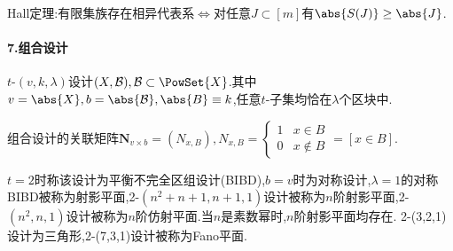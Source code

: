 \documentclass{article}
\begin{document}
Hall定理:有限集族存在相异代表系$\iff$对任意$J\subset [m]$有$\abs{S(J)}\geq \abs{J}$.

\paragraph{7.组合设计}$t$-$(v,k,\lambda)$设计$(X,\mathcal{B}),\mathcal{B}\subset \PowSet{X}$.其中$v=\abs{X},b=\abs{\mathcal{B}},\abs{B}\equiv k$,任意$t$-子集均恰在$\lambda$个区块中.

组合设计的关联矩阵$\bm{N}_{v\times b}=(N_{x,B}),N_{x,B}=\begin{cases}
    1&x\in B\\0&x\notin B
\end{cases}=[x\in B]$.

$t=2$时称该设计为平衡不完全区组设计(BIBD),$b=v$时为对称设计,$\lambda=1$的对称BIBD被称为射影平面,2-$(n^2+n+1,n+1,1)$设计被称为$n$阶射影平面,2-$(n^2,n,1)$设计被称为$n$阶仿射平面.当$n$是素数幂时,$n$阶射影平面均存在. 2-(3,2,1)设计为三角形,2-(7,3,1)设计被称为Fano平面.
\end{document}
